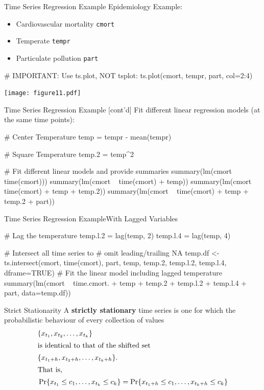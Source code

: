 \documentclass[ignorenonframetext,xcolor=x11names]{beamer}
\begin{document}
\begin{frame}[fragile]{Time Series Regression Example}
Epidemiology Example:
\begin{itemize}
  \item Cardiovascular mortality \texttt{cmort}
  \item Temperate \texttt{tempr}
  \item Particulate pollution \texttt{part}
\end{itemize}

\begin{Rcode}
# IMPORTANT: Use ts.plot, NOT tsplot:
ts.plot(cmort, tempr, part, col=2:4)
\end{Rcode} 

\vspace{-2\baselineskip}
\texttt{[image: figure11.pdf]}
\end{frame}

\begin{frame}[fragile]{Time Series Regression Example \small [cont'd]}
Fit different linear regression models (at the same time points):
\begin{Rcode}
# Center Temperature
temp = tempr - mean(tempr)

# Square Temperature
temp.2 = temp^2

# Fit different linear models and provide summaries
summary(lm(cmort ~ time(cmort)))
summary(lm(cmort ~ time(cmort) + temp))
summary(lm(cmort ~ time(cmort) + temp + temp.2))
summary(lm(cmort ~ time(cmort) + temp + temp.2 + part))
\end{Rcode}
\end{frame}

\begin{frame}[fragile]{Time Series Regression Example}{With Lagged Variables}

\begin{Rcode}
# Lag the temperature
temp.l.2 = lag(temp, 2)
temp.l.4 = lag(temp, 4)

# Intersect all time series to
# omit leading/trailing NA
temp.df <- ts.intersect(cmort, time(cmort), part, 
                        temp, temp.2, temp.l.2, 
                        temp.l.4,
                        dframe=TRUE)
# Fit the linear model including lagged temperature
summary(lm(cmort ~ time.cmort. + temp + temp.2 + 
                   temp.l.2 + temp.l.4 + part, 
           data=temp.df))
\end{Rcode}
\end{frame}


\begin{frame}{Strict Stationarity}
A \textbf{strictly stationary} time series is one for which the probabilistic behaviour of every collection of values
\begin{align*}&\{x_{t_1}, x_{t_2}, \ldots, x_{t_k} \} \\
\intertext{is identical to that of the shifted set}
&\{x_{t_1+h}, x_{t_2+h}, \ldots, x_{t_k + h} \}. \\
\intertext{That is,}
&\Pr \{ x_{t_1} \leq c_1, \ldots, x_{t_k} \leq c_k \} = \Pr \{ x_{t_1+h}\leq c_1, \ldots , x_{t_k+h} \leq c_k \}
\end{align*}
\end{frame}
\end{document}
